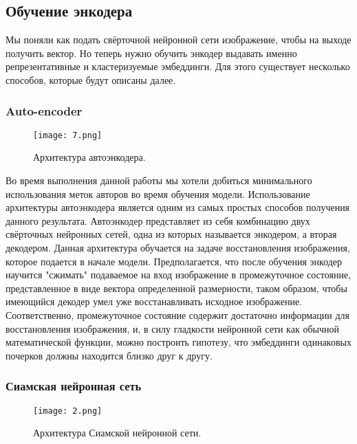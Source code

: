 \subsection{Обучение энкодера}

    Мы поняли как подать свёрточной нейронной сети изображение, чтобы на выходе получить вектор. Но теперь нужно обучить энкодер выдавать именно репрезентативные и кластеризуемые эмбеддинги. Для этого существует несколько способов, которые будут описаны далее.

\subsubsection{Auto-encoder}

    \begin{figure}[htbp]
        \centering
        \texttt{[image: 7.png]}
        \caption{Архитектура автоэнкодера.}
        \label{fig:example}
    \end{figure}

    Во время выполнения данной работы мы хотели добиться минимального использования меток авторов во время обучения модели. Использование архитектуры автоэнкодера является одним из самых простых способов получения данного результата. Автоэнкодер представляет из себя комбинацию двух свёрточных нейронных сетей, одна из которых называется энкодером, а вторая декодером. Данная архитектура обучается на задаче восстановления изображения, которое подается в начале модели. Предполагается, что после обучения энкодер научится "сжимать" подаваемое на вход изображение в промежуточное состояние, представленное в виде вектора определенной размерности, таком образом, чтобы имеющийся декодер умел уже восстанавливать исходное изображение. Соответственно, промежуточное состояние содержит достаточно информации для восстановления изображения, и, в силу гладкости нейронной сети как обычной математической функции, можно построить гипотезу, что эмбеддинги одинаковых почерков должны находится близко друг к другу. 

\subsubsection{Сиамская нейронная сеть}

    \begin{figure}[htbp]
        \centering
        \texttt{[image: 2.png]}
        \caption{Архитектура Сиамской нейронной сети.}
        \label{fig:example}
    \end{figure}

